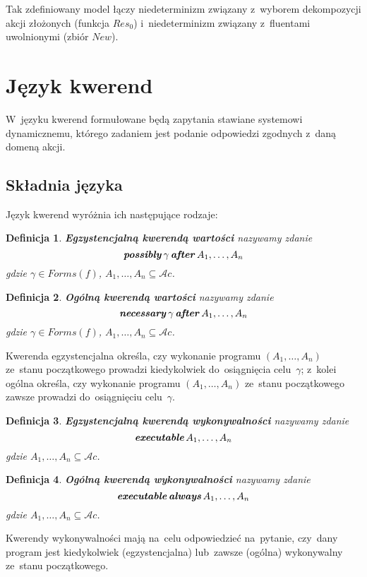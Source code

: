 \documentclass[11pt,a4paper]{article}
\newtheorem{defn}{Definicja}
\DeclareMathOperator{\After}{\textbf{\textit{after}}}
\DeclareMathOperator{\Always}{\textbf{\textit{always}}}
\DeclareMathOperator{\Executable}{\textbf{\textit{executable}}}
\DeclareMathOperator{\Possibly}{\textbf{\textit{possibly}}}
\DeclareMathOperator{\Necessary}{\textbf{\textit{necessary}}}
\begin{document}
Tak zdefiniowany model łączy niedeterminizm związany z~wyborem dekompozycji akcji złożonych (funkcja $Res_0$) i~niedeterminizm związany z~fluentami uwolnionymi (zbiór $New$).

\section{Język kwerend}

W~języku kwerend formułowane będą zapytania stawiane systemowi dynamicznemu, którego zadaniem jest podanie odpowiedzi zgodnych z~daną domeną akcji.

\subsection{Składnia języka}
    Język kwerend wyróżnia ich następujące rodzaje:

    \begin{defn}
        \textbf{Egzystencjalną kwerendą wartości} nazywamy zdanie
        $$ \Possibly \gamma \After A_1, \dots, A_n $$
        gdzie $\gamma \in Forms(f)$, $A_1, \dots, A_n \subseteq \mathcal{A}c$.
    \end{defn}

    \begin{defn}
        \textbf{Ogólną kwerendą wartości} nazywamy zdanie
        $$ \Necessary \gamma \After A_1, \dots, A_n $$
        gdzie $\gamma \in Forms(f)$, $A_1, \dots, A_n \subseteq \mathcal{A}c$.
    \end{defn}

    Kwerenda egzystencjalna określa, czy wykonanie programu $(A_1, \dots, A_n)$ ze~stanu początkowego prowadzi kiedykolwiek do~osiągnięcia celu~$\gamma$; z~kolei ogólna określa, czy wykonanie programu $(A_1, \dots, A_n)$ ze~stanu początkowego zawsze prowadzi do~osiągnięciu celu~$\gamma$.

    \begin{defn}
        \textbf{Egzystencjalną kwerendą wykonywalności} nazywamy zdanie
        $$ \Executable A_1, \dots, A_n $$
        gdzie $A_1, \dots, A_n \subseteq \mathcal{A}c$.
    \end{defn}

    \begin{defn}
        \textbf{Ogólną kwerendą wykonywalności} nazywamy zdanie
        $$ \Executable \Always A_1, \dots, A_n $$
        gdzie $A_1, \dots, A_n \subseteq \mathcal{A}c$.
    \end{defn}

    Kwerendy wykonywalności mają na~celu odpowiedzieć na~pytanie, czy~dany program jest kiedykolwiek (egzystencjalna) lub~zawsze (ogólna) wykonywalny ze~stanu początkowego.
\end{document}

